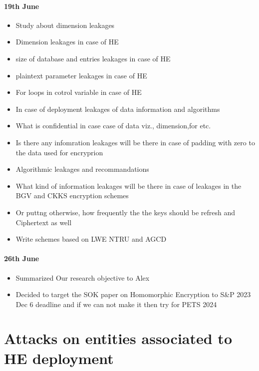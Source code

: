 \paragraph{19th June}
\begin{itemize}
    \item Study about dimension leakages
    \item Dimension leakages in case of HE
    \item size of database and entries leakages in case of HE
    \item plaintext parameter leakages in case of HE
    \item For loops in cotrol variable in case of HE
    \item In case of deployment leakages of data information and algorithms
    \item What is confidential in case case of data viz., dimension,for etc.
    \item Is there any infomration leakages will be there in case of padding with zero to the data used for encryprion
    \item Algorithmic leakages and recommandations
    \item What kind of information leakages will be there in case of leakages in the BGV and CKKS encryption schemes
    \item Or puttng otherwise, how  frequently the the keys should be refresh and Ciphertext as well
    \item Write schemes based on LWE NTRU and AGCD
\end{itemize}

\paragraph{26th June}
\begin{itemize}
    \item Summarized Our research objective to Alex
    \item Decided to target the SOK paper on Homomorphic Encryption to S\&P 2023 Dec 6 deadline and if we can not make it then try for PETS 2024
\end{itemize}




\section{Attacks on entities associated to HE deployment}

